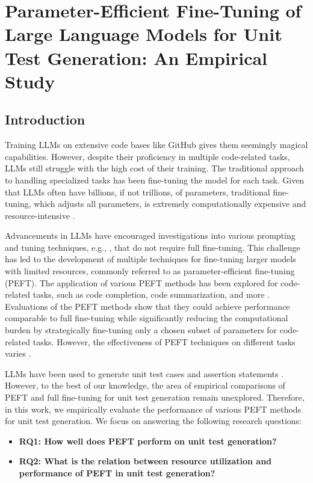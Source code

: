 \documentclass[12pt]{book}
\begin{document}
\chapter{Parameter-Efficient Fine-Tuning of Large Language Models for Unit Test Generation: An Empirical Study}


\section{Introduction}\label{sec1}
Training LLMs on extensive code bases like GitHub gives them seemingly magical capabilities. However, despite their proficiency in multiple code-related tasks, LLMs still struggle with the high cost of their training. The traditional approach to handling specialized tasks has been fine-tuning the model for each task. Given that LLMs often have billions, if not trillions, of parameters, traditional fine-tuning, which adjusts all parameters, is extremely computationally expensive and resource-intensive \citep{tufano2021unit}.

Advancements in LLMs have encouraged investigations into various prompting and tuning techniques, e.g., \citet{siddiq2024using, yuan2023manual, schäfer2023empirical}, that do not require full fine-tuning. This challenge has led to the development of multiple techniques for fine-tuning larger models with limited resources, commonly referred to as parameter-efficient fine-tuning (PEFT). The application of various PEFT methods has been explored for code-related tasks, such as code completion, code summarization, and more \citep{Ayupov2022ParameterEfficientFO, Goel2022OnTC, Wang2023PromptTI, weyssow2024exploring, Wang2023OneAF, Shi2023TowardsEF, Liu2023MFTCoderBC, yuan2023evaluating, Liu2023AnES}. Evaluations of the PEFT methods show that they could achieve performance comparable to full fine-tuning while significantly reducing the computational burden by strategically fine-tuning only a chosen subset of parameters for code-related tasks. However, the effectiveness of PEFT techniques on different tasks varies \citet{Ding2023ParameterefficientFO}. 

LLMs have been used to generate unit test cases and assertion statements \citep{Mastropaolo2021StudyingTU, yuan2023evaluating, siddiq2024using, yuan2023manual, schäfer2023empirical, tufano2021unit}. However, to the best of our knowledge, the area of empirical comparisons of PEFT and full fine-tuning for unit test generation remain unexplored. Therefore, in this work, we empirically evaluate the performance of various PEFT methods for unit test generation. We focus on answering the following research questions:
\begin{itemize} 

\item\textbf{RQ1: How well does PEFT perform on unit test generation?}
\item\textbf{RQ2: What is the relation between resource utilization and performance of PEFT in unit test generation?}

\end{itemize}
\end{document}
